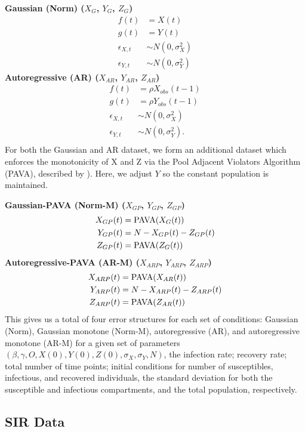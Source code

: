\message{ !name(draft_v13.tex)}\documentclass[12pt]{article}
\begin{document}
\noindent \textbf{Gaussian (Norm) ($X_{G}$, $Y_{G}$, $Z_{G}$)}
\begin{align*}
  f(t) &= X(t) \\
  g(t) &= Y(t) \\
  \epsilon_{X,t} &\sim N(0, \sigma_X^2) \\
  \epsilon_{Y,t} &\sim N(0, \sigma_Y^2)
\end{align*}
\textbf{Autoregressive (AR) ($X_{AR}$, $Y_{AR}$, $Z_{AR}$)}
\begin{align*}
  f(t) &= \rho X_{obs}(t-1) \\
  g(t) &= \rho Y_{obs}(t-1) \\
  \epsilon_{X,t} &\sim N(0, \sigma_X^2) \\
  \epsilon_{Y,t} &\sim N(0, \sigma_Y^2).\\
\end{align*}
For both the Gaussian and AR dataset, we form an additional dataset which enforces the monotonicity of X and Z via the Pool Adjacent Violators Algorithm (PAVA), described by \cite{friedman1984}).  Here, we adjust $Y$ so the constant population is maintained.

\noindent \textbf{Gaussian-PAVA (Norm-M) ($X_{GP}$, $Y_{GP}$, $Z_{GP}$)}
\begin{align*}
 X_{GP}(t) &= \textnormal{PAVA}(X_G(t)) \\
  Y_{GP}(t) &= N - X_{GP}(t) - Z_{GP}(t) \\
  Z_{GP}(t) &= \textnormal{PAVA}(Z_G(t)) \\
\end{align*}
\textbf{Autoregressive-PAVA (AR-M) ($X_{ARP}$, $Y_{ARP}$, $Z_{ARP}$)}
\begin{align*}
  X_{ARP}(t) &= \textnormal{PAVA}(X_{AR}(t)) \\
  Y_{ARP}(t) &= N - X_{ARP}(t) - Z_{ARP}(t) \\
  Z_{ARP}(t) &= \textnormal{PAVA}(Z_{AR}(t)) 
\end{align*}
This gives us a total of four error structures for each set of conditions: Gaussian (Norm), Gaussian monotone (Norm-M), autoregressive (AR), and autoregressive monotone (AR-M) for a given set of parameters $(\beta, \gamma, O, X(0), Y(0), Z(0), \sigma_X, \sigma_Y, N)$, the infection rate; recovery rate; total number of time points; initial conditions for number of susceptibles, infectious, and recovered individuals, the standard deviation for both the susceptible and infectious compartments, and the total population, respectively.

\subsection{SIR Data}
\end{document}

